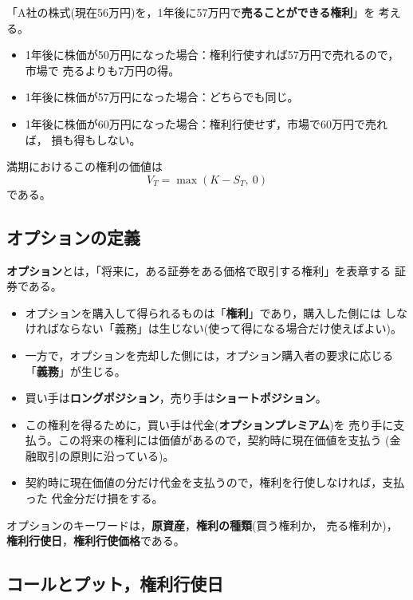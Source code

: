 \begin{example}[例2：売る権利]
「A社の株式(現在56万円)を，1年後に57万円で\textbf{売ることができる権利}」を
考える。
\begin{itemize}
\item 1年後に株価が50万円になった場合：権利行使すれば57万円で売れるので，市場で
売るよりも7万円の得。
\item 1年後に株価が57万円になった場合：どちらでも同じ。
\item 1年後に株価が60万円になった場合：権利行使せず，市場で60万円で売れば，
損も得もしない。
\end{itemize}
満期におけるこの権利の価値は
\[
V_T = \max(K - S_T,\ 0)
\]
である。
\end{example}

\vspace{18pt}

\subsection{オプションの定義}

\begin{definition}[オプション]
\textbf{オプション}とは，「将来に，ある証券をある価格で取引する権利」を表章する
証券である。
\end{definition}

\begin{itemize}
\item オプションを購入して得られるものは「\textbf{権利}」であり，購入した側には
しなければならない「義務」は生じない(使って得になる場合だけ使えばよい)。
\item 一方で，オプションを売却した側には，オプション購入者の要求に応じる
「\textbf{義務}」が生じる。
\item 買い手は\textbf{ロングポジション}，売り手は\textbf{ショートポジション}。
\item この権利を得るために，買い手は代金(\textbf{オプションプレミアム})を
売り手に支払う。この将来の権利には価値があるので，契約時に現在価値を支払う
(金融取引の原則に沿っている)。
\item 契約時に現在価値の分だけ代金を支払うので，権利を行使しなければ，支払った
代金分だけ損をする。
\end{itemize}

オプションのキーワードは，\textbf{原資産}，\textbf{権利の種類}(買う権利か，
売る権利か)，\textbf{権利行使日}，\textbf{権利行使価格}である。

\subsection{コールとプット，権利行使日}

